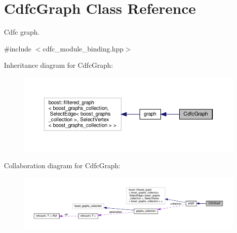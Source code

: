 \hypertarget{classCdfcGraph}{}\section{Cdfc\+Graph Class Reference}
\label{classCdfcGraph}


Cdfc graph.  




{\ttfamily \#include $<$cdfc\+\_\+module\+\_\+binding.\+hpp$>$}



Inheritance diagram for Cdfc\+Graph\+:
\nopagebreak
\begin{figure}[H]
\begin{center}
\leavevmode
\includegraphics[width=350pt]{d3/dc4/classCdfcGraph__inherit__graph}
\end{center}
\end{figure}


Collaboration diagram for Cdfc\+Graph\+:
\nopagebreak
\begin{figure}[H]
\begin{center}
\leavevmode
\includegraphics[width=350pt]{dc/d71/classCdfcGraph__coll__graph}
\end{center}
\end{figure}
